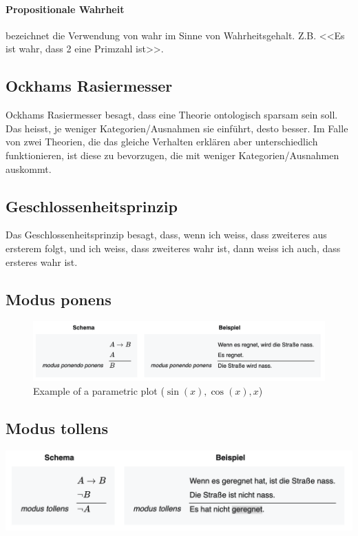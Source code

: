 \documentclass[../main.tex]{subfiles}
\begin{document}
\paragraph{Propositionale Wahrheit} bezeichnet die Verwendung von wahr im Sinne von Wahrheitsgehalt. Z.B. <<Es ist wahr, dass 2 eine Primzahl ist>>. 

\subsection{Ockhams Rasiermesser}
Ockhams Rasiermesser besagt, dass eine Theorie ontologisch sparsam sein soll. Das heisst, je weniger Kategorien/Ausnahmen sie einführt, desto besser. Im Falle von zwei Theorien, die das gleiche Verhalten erklären aber unterschiedlich funktionieren, ist diese zu bevorzugen, die mit weniger Kategorien/Ausnahmen auskommt. 

\subsection{Geschlossenheitsprinzip}
Das Geschlossenheitsprinzip besagt, dass, wenn ich weiss, dass zweiteres aus ersterem folgt, und ich weiss, dass zweiteres wahr ist, dann weiss ich auch, dass ersteres wahr ist. 

\subsection{Modus ponens}
\begin{figure}[h]

\centering
\includegraphics[width=\textwidth]{images/modus_pollens.png}
\caption{Example of a parametric plot ($\sin (x), \cos(x), x$)}
\end{figure}



\subsection{Modus tollens}
\includegraphics[width=\textwidth]{images/modus_tollens.png}
\end{document}
